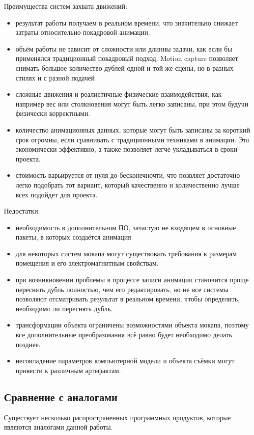 Преимущества систем захвата движений:
\begin{itemize}
	\item результат работы получаем в реальном времени, что значительно снижает затраты относительно покадровой анимации.
	\item объём работы не зависит от сложности или длинны задачи, как если бы применялся традиционный покадровый подход. Motion capture позволяет снимать большое количество дублей одной и той же сцены, но в разных стилях и с разной подачей
	\item сложные движения и реалистичные физические взаимодействия, как например вес или столкновения могут быть легко записаны, при этом будучи физически корректными.
	\item количество анимационных данных, которые могут быть записаны за короткий срок огромны, если сравнивать с традиционными техниками в анимации. Это экономически эффективно, а также позволяет легче укладываться в сроки проекта.
	\item стоимость варьируется от нуля до бесконечночти, что позвляет достаточно легко подобрать тот вариант, который качественно и количественно лучше всех подойдет для проекта.
\end{itemize}

Недостатки:
\begin{itemize}
	\item необходимость в дополнительном ПО, зачастую не входящем в основные пакеты, в которых создаётся анимация
	\item для некоторых систем мокапа могут существовать требования к размерам помещения и его электромагнитным свойствам.
	\item при возникновении проблемы в процессе записи анимации становится проще переснять дубль полностью, чем его редактировать, но не все системы позволяют отсматривать результат в реальном времени, чтобы определить, необходимо ли переснять дубль.
	\item трансформации объекта ограничены возможностями объекта мокапа, поэтому все дополнительные преобразования всё равно будет необходимо делать позднее.
	\item несовпадение параметров компьютерной модели и объекта съёмки могут привести к различным артефактам.
\end{itemize}



\subsection{Сравнение с аналогами}
Существует несколько распространенных программных продуктов, которые являются аналогами данной работы.

